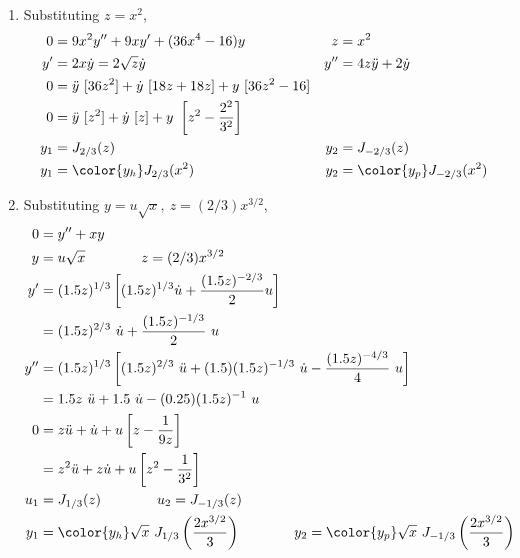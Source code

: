 \begin{enumerate}
    \item Substituting $ z = x^2 $,
          \begin{align}
              0   & = 9x^2y'' + 9xy' + (36x^4 - 16)y                             &
              z   & = x^2                                                          \\
              y'  & = 2x \dot{y} = 2\sqrt{z}\dot{y}                              &
              y'' & = 4z\ddot{y} + 2\dot{y}                                        \\
              0   & = \ddot{y}\ [36z^2] + \dot{y}\ [18z + 18z] + y\ [36z^2 - 16]   \\
              0   & = \ddot{y}\ [z^2] + \dot{y}\ [z] + y\ \left[ z^2
              - \frac{2^2}{3^2} \right]                                            \\
              y_1 & = J_{2/3}(z)                                                 &
              y_2 & = J_{-2/3}(z)                                                  \\
              y_1 & = \color{y_h} J_{2/3}(x^2)                                   &
              y_2 & = \color{y_p} J_{-2/3}(x^2)
          \end{align}

    \item Substituting $ y = u\sqrt{x},\ z = (2/3)x^{3/2} $,
          \begin{align}
              0   & = y'' + xy                                                       \\
              y   & = u \sqrt{x} \qquad\qquad z = (2/3)x^{3/2}                       \\
              y'  & = (1.5z)^{1/3} \left[ (1.5z)^{1/3} \dot{u}
              + \frac{(1.5z)^{-2/3}}{2} u \right]                                    \\
                  & = (1.5z)^{2/3}\ \dot{u} + \frac{(1.5z)^{-1/3}}{2}\ u             \\
              y'' & =(1.5z)^{1/3} \left[ (1.5z)^{2/3}\ \ddot{u}
              + (1.5)(1.5z)^{-1/3}\ \dot{u} - \frac{(1.5z)^{-4/3}}{4}\ u\right]      \\
                  & = 1.5z\ \ddot{u} + 1.5\ \dot{u} - (0.25)(1.5z)^{-1}\ u           \\
              0   & = z\ddot{u} + \dot{u} + u \left[z - \frac{1}{9z} \right]         \\
                  & = z^2 \ddot{u} + z\dot{u} + u \left[ z^2 - \frac{1}{3^2} \right] \\
              u_1 & = J_{1/3}(z) \qquad\qquad u_2 = J_{-1/3}(z)                      \\
              y_1 & ={\color{y_h} \sqrt{x}\  J_{1/3}
              \left( \frac{2x^{3/2}}{3} \right)} \qquad\qquad
              y_2 = {\color{y_p} \sqrt{x}\ J_{-1/3}
              \left( \frac{2x^{3/2}}{3} \right)}
          \end{align}


\end{enumerate}
